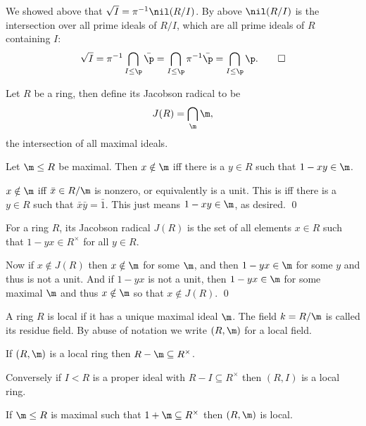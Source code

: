 \ecoro

\bproof

    We showed above that $\sqrt I=\pi^{-1}\nil(R/I)$.
    By above $\nil(R/I)$ is the intersection over all prime ideals of $R/I$, which are all prime ideals of $R$ containing $I$:
    $$ \sqrt I = \pi^{-1}\bigcap_{I\leq\p}\bar\p = \bigcap_{I\leq\p}\pi^{-1}\bar\p = \bigcap_{I\leq\p}\p . \qed $$

\eproof

\bdefn

    Let $R$ be a ring, then define its {\emphcolor Jacobson radical} to be
    $$ J(R) = \bigcap_\m\m , $$
    the intersection of all maximal ideals.

\edefn

\blemm

    Let $\m\leq R$ be maximal.
    Then $x\notin\m$ iff there is a $y\in R$ such that $1-xy\in\m$.

\elemm

\bproof

    $x\notin\m$ iff $\bar x\in R/\m$ is nonzero, or equivalently is a unit.
    This is iff there is a $y\in R$ such that $\bar x\bar y=\bar 1$.
    This just means $1-xy\in\m$, as desired.
    \qed

\eproof

\bcoro

    For a ring $R$, its Jacobson radical $J(R)$ is the set of all elements $x\in R$ such that $1-yx\in R^\times$ for all $y\in R$.

\ecoro

\bproof

    Now if $x\notin J(R)$ then $x\notin\m$ for some $\m$, and then $1-yx\in\m$ for some $y$ and thus is not a unit.
    And if $1-yx$ is not a unit, then $1-yx\in\m$ for some maximal $\m$ and thus $x\notin\m$ so that $x\notin J(R)$.
    \qed

\eproof

\bdefn

    A ring $R$ is {\emphcolor local} if it has a unique maximal ideal $\m$.
    The field $k=R/\m$ is called its {\emphcolor residue field}.
    By abuse of notation we write $(R,\m)$ for a local field.

\edefn

\bprop

    \benum
        \item If $(R,\m)$ is a local ring then $R-\m\subseteq R^\times$.
        \item Conversely if $I<R$ is a proper ideal with $R-I\subseteq R^\times$ then $(R,I)$ is a local ring.
        \item If $\m\leq R$ is maximal such that $1+\m\subseteq R^\times$ then $(R,\m)$ is local.
    \eenum

